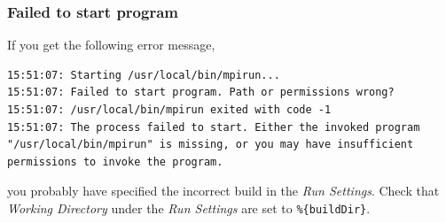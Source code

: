 \documentclass[11pt]{article}
\begin{document}
\subsubsection{Failed to start program}
If you get the following error message,
\begin{lstlisting}
15:51:07: Starting /usr/local/bin/mpirun...
15:51:07: Failed to start program. Path or permissions wrong?
15:51:07: /usr/local/bin/mpirun exited with code -1
15:51:07: The process failed to start. Either the invoked program "/usr/local/bin/mpirun" is missing, or you may have insufficient permissions to invoke the program.
\end{lstlisting}
you probably have specified the incorrect build in the \textit{Run Settings}. Check that \textit{Working Directory} under the \textit{Run Settings} are set to \texttt{\%\{buildDir\}}.
\end{document}
